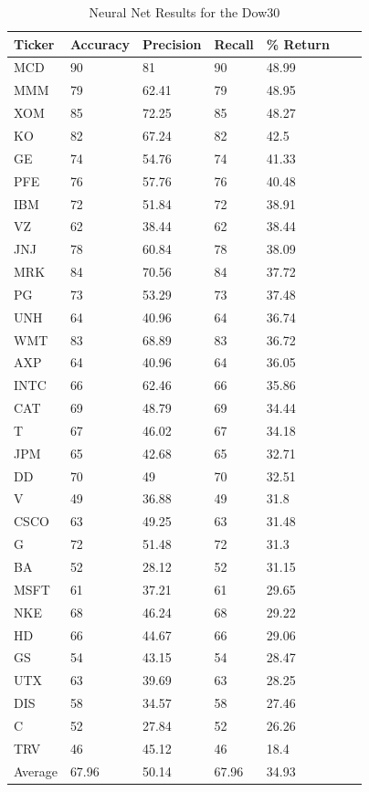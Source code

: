 \documentclass{article}
\begin{document}
\begin{table}[h]
  \begin{tabular}{@{}lllllll@{}}
    \toprule
    Ticker & Accuracy & Precision & Recall & \% Return & \\ \midrule
    MCD & 90 & 81 & 90 & 48.99 & \\
    MMM & 79 & 62.41 & 79 & 48.95 & \\
    XOM & 85 & 72.25 & 85 & 48.27 & \\
    KO & 82 & 67.24 & 82 & 42.5 & \\
    GE & 74 & 54.76 & 74 & 41.33 & \\
    PFE & 76 & 57.76 & 76 & 40.48 & \\
    IBM & 72 & 51.84 & 72 & 38.91 & \\
    VZ & 62 & 38.44 & 62 & 38.44 & \\
    JNJ & 78 & 60.84 & 78 & 38.09 & \\
    MRK & 84 & 70.56 & 84 & 37.72 & \\
    PG & 73 & 53.29 & 73 & 37.48 & \\
    UNH & 64 & 40.96 & 64 & 36.74 & \\
    WMT & 83 & 68.89 & 83 & 36.72 & \\
    AXP & 64 & 40.96 & 64 & 36.05 & \\
    INTC & 66 & 62.46 & 66 & 35.86 & \\
    CAT & 69 & 48.79 & 69 & 34.44 & \\
    T & 67 & 46.02 & 67 & 34.18 & \\
    JPM & 65 & 42.68 & 65 & 32.71 & \\
    DD & 70 & 49 & 70 & 32.51 & \\
    V & 49 & 36.88 & 49 & 31.8 & \\
    CSCO & 63 & 49.25 & 63 & 31.48 & \\
    G & 72 & 51.48 & 72 & 31.3 & \\
    BA & 52 & 28.12 & 52 & 31.15 & \\
    MSFT & 61 & 37.21 & 61 & 29.65 & \\
    NKE & 68 & 46.24 & 68 & 29.22 & \\
    HD & 66 & 44.67 & 66 & 29.06 & \\
    GS & 54 & 43.15 & 54 & 28.47 & \\
    UTX & 63 & 39.69 & 63 & 28.25 & \\
    DIS & 58 & 34.57 & 58 & 27.46 & \\
    C & 52 & 27.84 & 52 & 26.26 & \\
    TRV & 46 & 45.12 & 46 & 18.4 & \\ \bottomrule
    Average & 67.96 & 50.14 & 67.96 & 34.93 & \\
  \end{tabular}
  \caption{Neural Net Results for the Dow30}
  \label{my-label}
\end{table}
\end{document}
